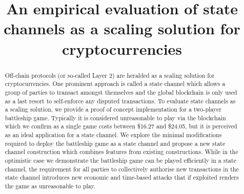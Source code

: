 \documentclass{llncs}
\begin{document}
	\title{An empirical evaluation of state channels as a scaling solution for cryptocurrencies}
	
	
%	

	\maketitle
	\begin{abstract}
		 Off-chain protocols (or so-called Layer 2) are heralded as a scaling solution for cryptocurrencies.
		 One prominent approach is called a state channel which allows a group of parties to transact amongst themselves and the global blockchain is only used as a last resort to self-enforce any disputed transactions. 
		 To evaluate state channels as a scaling solution, we provide a proof of concept implementation for a two-player battleship game.
		 Typically it is considered unreasonable to play via the blockchain which we confirm as a single game costs between \$16.27 and \$24.05, but it is perceived as an ideal application for a state channel. 
		 We explore the minimal modifications required to deploy the battleship game as a state channel and propose a new state channel construction which combines features from existing constructions. 
		 While in the optimistic case we demonstrate the battleship game can be played efficiently in a state channel, the requirement for all parties to collectively authorise new transactions in the state channel introduces new economic and time-based attacks that if exploited renders the game as unreasonable to play. 
	\end{abstract} 
\end{document}
